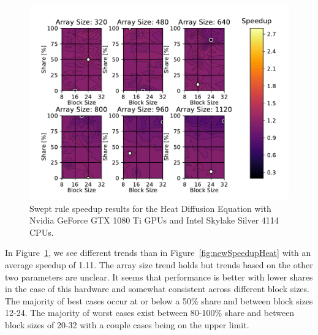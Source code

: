 \documentclass[journal,article,submit,moreauthors,pdftex]{Definitions/mdpi}
\newcommand\fs{1}
\def\oldCPU{Intel Skylake Silver 4114} %
\def\oldGPU{Nvidia GeForce GTX 1080 Ti}
\begin{document}
\begin{figure}
    \widefigure
    \begin{center}
        \includegraphics[scale=\fs, trim={0.75cm 0.4cm 0.8cm 0.7cm},clip]{figs/speedUpheatOld.pdf}
        \caption{Swept rule speedup results for the Heat Diffusion Equation with \oldGPU{} GPUs and \oldCPU{} CPUs.}
        \label{fig:oldSpeedupHeat} 
    \end{center}
\end{figure}
\begin{paracol}{2}
\linenumbers
\switchcolumn

In Figure~\ref{fig:oldSpeedupHeat}, we see different trends than in Figure~\ref{fig:newSpeedupHeat} with an average speedup of 1.11. The array size trend holds but trends based on the other two parameters are unclear. It seems that performance is better with lower shares in the case of this hardware and somewhat consistent across different block sizes. The majority of best cases occur at or below a 50\% share and between block sizes 12-24. The majority of worst cases exist between 80-100\% share and between block sizes of 20-32 with a couple cases being on the upper limit.

\end{paracol}
\end{document}
